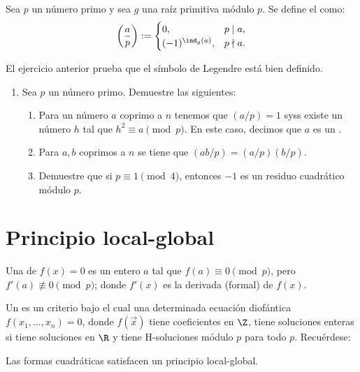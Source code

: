\documentclass[11pt, reqno]{amsart}
\begin{document}
\begin{mydef}
	Sea $p$ un número primo y sea $g$ una raíz primitiva módulo $p$.
	Se define el  como:
	$$ \left( \frac{a}{p} \right) :=
	\begin{cases}
		0, & p \mid a, \\
		(-1)^{\ind_g(a)}, & p \nmid a.
	\end{cases} $$
\end{mydef}
El ejercicio anterior prueba que el símbolo de Legendre está bien definido.

\begin{enumerate}[resume]
	\item Sea $p$ un número primo. Demuestre las siguientes:
		\begin{enumerate}
			\item Para un número $a$ coprimo a $n$ tenemos que $(a/p) = 1$ syss existe un número $h$ tal que $h^2 \equiv a \pmod p$.
				En este caso, decimos que $a$ es un .
			\item Para $a, b$ coprimos a $n$ se tiene que $(ab/p) = (a/p) (b/p)$.
			\item Demuestre que si $p \equiv 1 \pmod 4$, entonces $-1$ es un residuo cuadrático módulo $p$.
		\end{enumerate}
\end{enumerate}

\section{Principio local-global}
\begin{mydef}
	Una  de $f(x) = 0$ es un entero $a$ tal que $f(a) \equiv 0 \pmod p$, pero $f'(a) \not\equiv 0 \pmod p$;
	donde $f'(x)$ es la derivada (formal) de $f(x)$.
\end{mydef}

Un  es un criterio bajo el cual una determinada ecuación diofántica $f(x_1, \dots, x_n) = 0$,
donde $f(\vec x)$ tiene coeficientes en $\Z$, tiene soluciones enteras si tiene soluciones en $\R$ y tiene H-soluciones módulo $p$
para todo $p$.
Recuérdese:
\begin{thm}
	Las formas cuadráticas satisfacen un principio local-global.
\end{thm}
\end{document}
